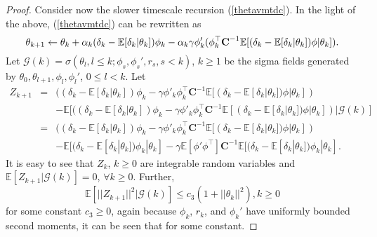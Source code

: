 \begin{proof}
Consider now the slower timescale recursion (\ref{thetavmtdc}). In the light of the above,
(\ref{thetavmtdc}) can be rewritten as 
\begin{equation}
 {\theta}_{k+1} \leftarrow {\theta}_{k} + \alpha_k (\delta_k -\mathbb{E}[\delta_k|{\theta}_k]) {\phi}_k\\
 - \alpha_k \gamma{\phi}'_{k}({\phi}^{\top}_k \textbf{C}^{-1}\mathbb{E}[(\delta_k -\mathbb{E}[\delta_k|{\theta}_k]){\phi}|{\theta}_k]).
\end{equation}
Let $\mathcal{G}(k)=\sigma({\theta}_l,l\leq k;{\phi}_s,{\phi}_s',r_s,s<k)$, 
$k\geq 1$ be the sigma fields
generated by ${\theta}_0,{\theta}_{l+1},{\phi}_l,{\phi}_l'$,
$0\leq l<k$. Let
\begin{equation*}
    \begin{array}{ccl}
 Z_{k+1}&=&((\delta_k -\mathbb{E}[\delta_k|{\theta}_k]) {\phi}_k - \gamma {\phi}'_{k}{\phi}^{\top}_k \textbf{C}^{-1}\mathbb{E}[(\delta_k -\mathbb{E}[\delta_k|{\theta}_k]){\phi}|{\theta}_k])\\ 
     & &-\mathbb{E}[((\delta_k -\mathbb{E}[\delta_k|{\theta}_k]) {\phi}_k - \gamma {\phi}'_{k}{\phi}^{\top}_k \textbf{C}^{-1}\mathbb{E}[(\delta_k -\mathbb{E}[\delta_k|{\theta}_k]){\phi}|{\theta}_k])|\mathcal{G}(k)]\\
    &=&((\delta_k -\mathbb{E}[\delta_k|{\theta}_k]) {\phi}_k - \gamma {\phi}'_{k}{\phi}^{\top}_k \textbf{C}^{-1}\mathbb{E}[(\delta_k -\mathbb{E}[\delta_k|{\theta}_k]){\phi}|{\theta}_k])\\
    & &-\mathbb{E}[(\delta_k -\mathbb{E}[\delta_k|{\theta}_k]) {\phi}_k|{\theta}_k] - \gamma\mathbb{E}[{\phi}' {\phi}^{\top}]\textbf{C}^{-1}\mathbb{E}[(\delta_k -\mathbb{E}[\delta_k|{\theta}_k]) {\phi}_k|{\theta}_k].
    \end{array}
\end{equation*}
It is easy to see that $Z_k$, $k\geq 0$ are integrable random variables and $\mathbb{E}[Z_{k+1}|\mathcal{G}(k)]=0$, $\forall k\geq0$. Further,
\begin{equation*}
\mathbb{E}[||Z_{k+1}||^2|\mathcal{G}(k)]\leq
c_3(1+||{\theta}_k||^2), k\geq 0
\end{equation*}
for some constant $c_3 \geq 0$, again because ${\phi}_k$, $r_k$, and ${\phi}_k'$ have
uniformly bounded second moments, it can be seen that for some constant.


\end{proof}
